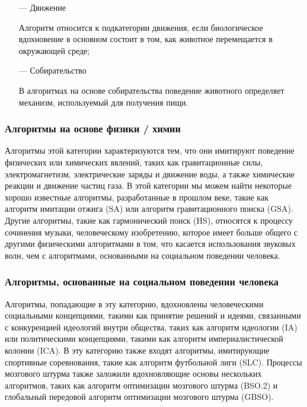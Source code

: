 \begin{itemize}
    \item[—] Движение

        Алгоритм относится к подкатегории
        движения, если биологическое вдохновение в основном состоит в
        том, как животное перемещается в окружающей среде;

    \item[—] Собирательство

        В алгоритмах на основе собирательства поведение животного определяет
        механизм, используемый для получения пищи.

\end{itemize}


\subsubsection{Алгоритмы на основе физики / химии}

Алгоритмы этой категории характеризуются тем, что они имитируют поведение
физических или химических явлений, таких как гравитационные силы,
электромагнетизм, электрические заряды и движение воды, а также химические
реакции и движение частиц газа. В этой категории мы можем найти
некоторые хорошо известные алгоритмы, разработанные в прошлом веке,
такие как алгоритм имитации отжига (SA) или алгоритм гравитационного поиска (GSA).
Другие алгоритмы, такие как гармонический поиск (HS), относятся к процессу сочинения
музыки, человеческому изобретению, которое имеет больше общего с другими
физическими алгоритмами в том, что касается использования звуковых волн,
чем с алгоритмами, основанными на социальном поведении человека.

\subsubsection{Алгоритмы, основанные на социальном поведении человека}

Алгоритмы, попадающие в эту категорию, вдохновлены человеческими социальными
концепциями, такими как принятие решений и идеями, связанными с конкуренцией
идеологий внутри общества, таких как алгоритм идеологии (IA) или политическими
концепциями, такими как алгоритм империалистической колонии (ICA). В эту
категорию также входят алгоритмы, имитирующие спортивные соревнования,
такие как алгоритм футбольной лиги (SLC). Процессы мозгового штурма также заложили
вдохновляющие основы нескольких алгоритмов, таких как алгоритм оптимизации
мозгового штурма (BSO.2) и глобальный передовой алгоритм оптимизации мозгового
штурма (GBSO).

